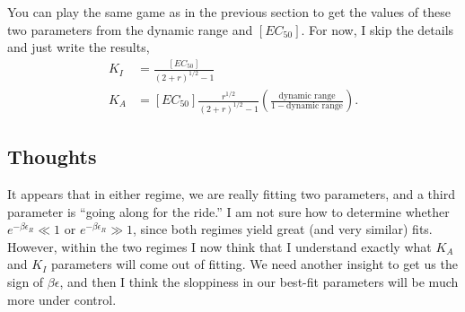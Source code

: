 \documentclass[10pt,letterpaper]{article}
\begin{document}
You can play the same game as in the previous section to get the values of these two parameters from the dynamic range and $[EC_{50}]$. For now, I skip the details and just write the results,
\begin{align}
K_I &= \frac{[EC_{50}]}{\left(2+r\right)^{1/2}-1}\\
K_A &= [EC_{50}] \frac{r^{1/2}}{\left(2+r\right)^{1/2}-1} \left(\frac{\text{dynamic range}}{1-\text{dynamic range}}\right).
\end{align}

\subsection{Thoughts}

It appears that in either regime, we are really fitting two parameters, and a
third parameter is ``going along for the ride.'' I am not sure how to determine
whether $e^{-\beta \epsilon_R} \ll 1$ or $e^{-\beta \epsilon_R} \gg 1$, since
both regimes yield great (and very similar) fits. However, within the two
regimes I now think that I understand exactly what $K_A$ and $K_I$ parameters
will come out of fitting. We need another insight to get us the sign of $\beta
\epsilon$, and then I think the sloppiness in our best-fit parameters will be
much more under control.

\nolinenumbers



\end{document}
